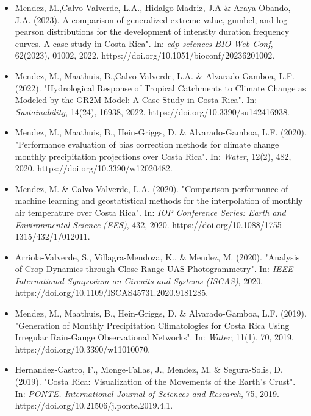 \documentclass[10pt,letterpaper,english]{article}
\begin{document}
\begin{paracol}{2}
\begin{rightcolumn}
\begin{itemize}[leftmargin=*]
\item Mendez, M.,Calvo-Valverde, L.A., Hidalgo-Madriz, J.A \& Araya-Obando, J.A. (2023). A comparison of generalized extreme value, gumbel, and log-pearson distributions for the development of intensity duration frequency curves. A case study in Costa Rica". In: \textit{edp-sciences BIO Web Conf}, 62(2023), 01002, 2022. \newline https://doi.org/10.1051/bioconf/20236201002.
\item Mendez, M., Maathuis, B.,Calvo-Valverde, L.A. \& Alvarado-Gamboa, L.F. (2022). "Hydrological Response of Tropical Catchments to Climate Change as Modeled by the GR2M Model: A Case Study in Costa Rica". In: \textit{Sustainability}, 14(24), 16938, 2022. \newline https://doi.org/10.3390/su142416938.
\item Mendez, M., Maathuis, B., Hein-Griggs, D. \& Alvarado-Gamboa, L.F. (2020). "Performance evaluation of bias correction methods for climate change monthly precipitation projections over Costa Rica". In: \textit{Water}, 12(2), 482, 2020. \newline https://doi.org/10.3390/w12020482.
\item Mendez, M. \& Calvo-Valverde, L.A. (2020). "Comparison performance of machine learning and geostatistical methods for the interpolation of monthly air temperature over Costa Rica". In: \textit{IOP Conference Series: Earth and Environmental Science (EES)}, 432, 2020. \newline https://doi.org/10.1088/1755-1315/432/1/012011.
\item Arriola-Valverde, S., Villagra-Mendoza, K., \& Mendez, M. (2020). "Analysis of Crop Dynamics through Close-Range UAS Photogrammetry". In: \textit{IEEE International Symposium on Circuits and Systems (ISCAS)}, 2020. \newline https://doi.org/10.1109/ISCAS45731.2020.9181285.
\item Mendez, M., Maathuis, B., Hein-Griggs, D. \& Alvarado-Gamboa, L.F. (2019). "Generation of Monthly Precipitation Climatologies for Costa Rica Using Irregular Rain-Gauge Observational Networks". In: \textit{Water}, 11(1), 70, 2019. \newline https://doi.org/10.3390/w11010070.
\item Hernandez-Castro, F., Monge-Fallas, J., Mendez, M. \& Segura-Solis, D. (2019). "Costa Rica: Visualization of the Movements of the Earth’s Crust". In: \textit{PONTE. International Journal of Sciences and Research}, 75, 2019. \newline https://doi.org/10.21506/j.ponte.2019.4.1.

\end{itemize}
\end{rightcolumn}
\end{paracol}
\end{document}
